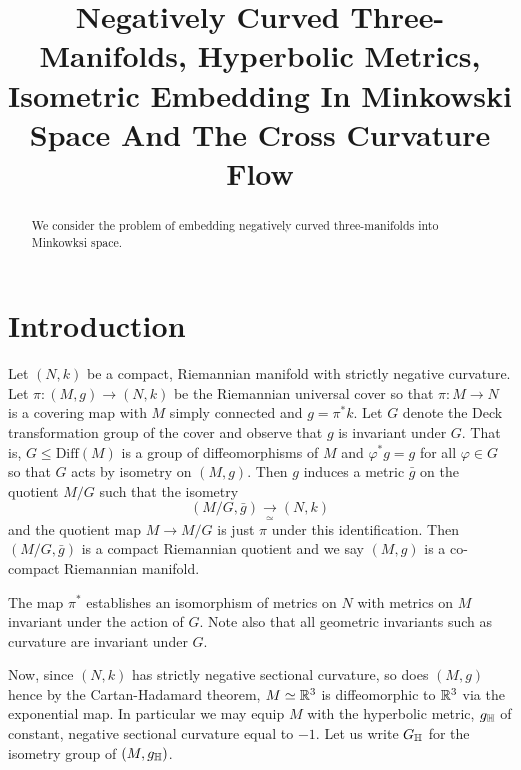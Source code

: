 \documentclass[a4paper, 12pt]{amsart}
\begin{document}
\title[Negatively Curved Three Manifolds]{Negatively Curved Three-Manifolds, Hyperbolic Metrics, Isometric Embedding In Minkowski Space And The Cross Curvature Flow}

\date{}

\dedicatory{}

\begin{abstract}
We consider the problem of embedding negatively curved three-manifolds into Minkowksi space.
\end{abstract}

\maketitle

\section{Introduction}
\label{sec:intro}

Let \((N, k)\) be a compact, Riemannian manifold with strictly negative curvature. Let \(\pi : (M, g) \to (N, k)\) be the Riemannian universal cover so that \(\pi : M \to N\) is a covering map with \(M\) simply connected and \(g = \pi^{\ast} k\). Let \(G\) denote the Deck transformation group of the cover and observe that \(g\) is invariant under \(G\). That is, \(G \leq \text{Diff}(M)\) is a group of diffeomorphisms of \(M\) and \(\varphi^{\ast} g = g\) for all \(\varphi \in G\) so that \(G\) acts by isometry on \((M, g)\). Then \(g\) induces a metric \(\bar{g}\) on the quotient \(M/G\) such that the isometry
\[
(M/G, \bar{g}) \underset{\simeq}{\to} (N, k)
\]
and the quotient map \(M \to M/G\) is just \(\pi\) under this identification. Then \((M/G, \bar{g})\) is a compact Riemannian quotient and we say \((M, g)\) is a co-compact Riemannian manifold.

\begin{rem}
The map \(\pi^{\ast}\) establishes an isomorphism of metrics on \(N\) with metrics on \(M\) invariant under the action of \(G\). Note also that all geometric invariants such as curvature are invariant under \(G\).
\end{rem}

Now, since \((N, k)\) has strictly negative sectional curvature, so does \((M, g)\) hence by the Cartan-Hadamard theorem, \(M \simeq \mathbb{R}^3\) is diffeomorphic to \(\mathbb{R}^3\) via the exponential map. In particular we may equip \(M\) with the hyperbolic metric, \(g_{\mathbb{H}}\) of constant, negative sectional curvature equal to \(-1\). Let us write \(G_{\mathbb{H}}\) for the isometry group of \((M, g_{\mathbb{H}})\).
\end{document}
